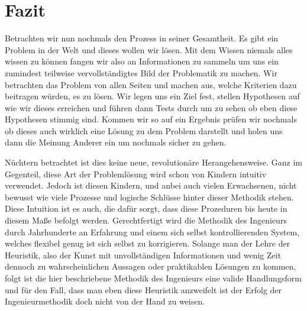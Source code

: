 \section{Fazit}

Betrachten wir nun nochmals den Prozess in seiner Gesamtheit. Es gibt ein Problem in der Welt und 
dieses wollen wir lösen. Mit dem Wissen niemals alles wissen zu können fangen wir also an 
Informationen zu sammeln um uns ein zumindest teilweise vervollständigtes Bild der Problematik zu 
machen. Wir betrachten das Problem von allen Seiten und machen aus, welche Kriterien dazu beitragen 
würden, es zu lösen. Wir legen uns ein Ziel fest, stellen Hypothesen auf wie wir dieses erreichen 
und führen dann Tests durch um zu sehen ob eben diese Hypothesen stimmig sind. Kommen wir so auf 
ein Ergebnis prüfen wir nochmals ob dieses auch wirklich eine Lösung zu dem Problem darstellt und 
holen uns dann die Meinung Anderer ein um nochmals sicher zu gehen. 

Nüchtern betrachtet ist dies keine neue, revolutionäre Herangehensweise. Ganz im Gegenteil, 
diese Art der Problemlösung wird schon von Kindern intuitiv verwendet. Jedoch ist diesen 
Kindern, und anbei auch vielen Erwachsenen, nicht bewusst wie viele Prozesse und logische 
Schlüsse hinter dieser Methodik stehen. Diese Intuition ist es auch, die dafür sorgt, dass diese 
Prozeduren bis heute in diesem Maße befolgt werden. Gerechtfertigt wird die Methodik des Ingenieurs 
durch Jahrhunderte an Erfahrung und einem sich selbst kontrollierenden System, welches flexibel 
genug ist sich selbst zu korrigieren. Solange man der Lehre der Heuristik, also der Kunst mit 
unvollständigen Informationen und wenig Zeit dennoch zu wahrscheinlichen Aussagen oder praktikablen 
Lösungen zu kommen, folgt ist die hier beschriebene Methodik des Ingenieurs eine valide Handlungsform 
und für den Fall, dass man eben diese Heuristik anzweifelt ist der Erfolg der Ingenieurmethodik 
doch nicht von der Hand zu weisen.